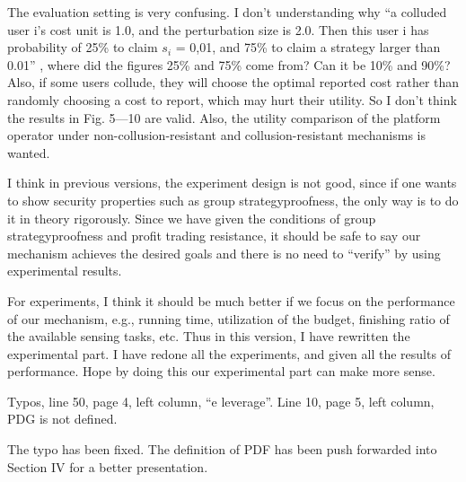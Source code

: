 \documentclass[a4paper,11pt]{exam}
\begin{document}
\begin{questions}
\question The evaluation setting is very confusing. I don’t understanding why “a colluded user i’s cost unit is 1.0, and the perturbation size is 2.0. Then this user i has probability of 25\% to claim $s_i$ = 0,01, and 75\% to claim a strategy larger than 0.01” , where did the figures 25\% and 75\% come from? Can it be 10\% and 90\%? Also, if some users collude, they will choose the optimal reported cost rather than randomly choosing a cost to report, which may hurt their utility.  So I don’t think the results in Fig. 5---10 are valid. Also, the utility comparison of the platform operator under non-collusion-resistant and collusion-resistant mechanisms is wanted. 
\begin{solution}
I think in previous versions, the experiment design is not good, since if one wants to show security properties such as group strategyproofness, the only way is to do it in theory rigorously. Since we have given the conditions of group strategyproofness and profit trading resistance, it should be safe to say our mechanism achieves the desired goals and there is no need to ``verify'' by using experimental results. 

For experiments, I think it should be much better if we focus on the performance of our mechanism, e.g., running time, utilization of the budget, finishing ratio of the available sensing tasks, etc. Thus in this version, I have rewritten the experimental part. I have redone all the experiments, and given all the results of performance. Hope by doing this our experimental part can make more sense. 
\end{solution}

\question Typos, line 50, page 4, left column, “e leverage”. Line 10, page 5, left column, PDG is not defined.
\begin{solution}
The typo has been fixed. 
The definition of PDF has been push forwarded into Section IV for a better presentation.
\end{solution}
\end{questions}
\end{document}
